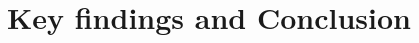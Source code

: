 \documentclass[
12pt, %
oneside, %
english, %
onehalfspacing, %
onehalfspacing, %
headsepline, %
]{MastersDoctoralThesis} %
\begin{document}
\chapter{Key findings and Conclusion}   
% 
%
% 
% 


\appendix %




%


\printbibliography[heading=bibintoc]

\end{document}
